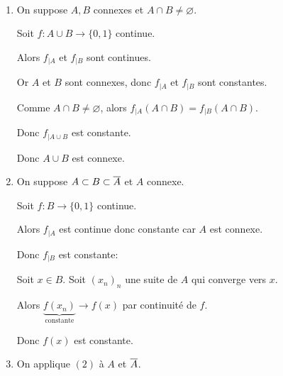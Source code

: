 \documentclass[french,a4paper,10pt]{article}
\begin{document}
	\begin{myproof}\,
		\begin{enumerate}[label= (\arabic*)]
			\item On suppose $A, B$ connexes et $A\cap B\ne\varnothing$.

			Soit $f\colon A\cup B\to\{0,1\}$ continue.

			Alors $f_{|A}$ et $f_{|B}$ sont continues.

			Or $A$ et $B$ sont connexes, donc $f_{|A}$ et $f_{|B}$ sont constantes.

			Comme $A\cap B\ne\varnothing$, alors $f_{|A}(A\cap B)=f_{|B}(A\cap B)$.

			Donc $f_{|A\cup B}$ est constante.

			Donc $A\cup B$ est connexe.

		\item On suppose $A\subset B\subset \overline{A}$ et $A$ connexe.

			Soit $f\colon B\to\{0,1\}$ continue.

			Alors $f_{|A}$ est continue donc constante car $A$ est connexe.

			Donc $f_{|B}$ est constante:

			Soit $x\in B$. Soit ${(x_n)}_n$ une suite de $A$ qui converge vers $x$.

			Alors $\underbrace{f(x_n)}_{\text{constante}}\to f(x)$ par continuité de $f$.

			Donc $f(x)$ est constante.

		\item On applique $(2)$ à $A$ et $\overline{A}$.
		\end{enumerate}
	\end{myproof}
\end{document}
